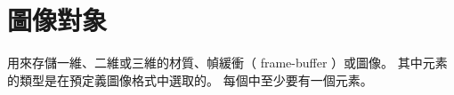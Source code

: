 \section{圖像對象}

用來存儲一維、二維或三維的材質、幀緩衝（ frame-buffer ）或圖像。
其中元素的類型是在預定義圖像格式中選取的。
每個中至少要有一個元素。









